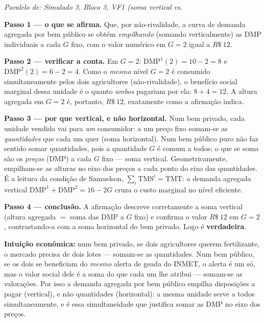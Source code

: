 \begin{solucao}
{\footnotesize\textit{Paralelo de: Simulado 3, Bloco 3, VF1 (soma vertical vs.}}\par\vspace{0.2em}
\textbf{Passo 1 --- o que se afirma.} Que, por n\~ao-rivalidade, a curva de demanda agregada por bem p\'ublico se obt\'em \emph{empilhando} (somando verticalmente) as DMP individuais a cada $G$ fixo, com o valor num\'erico em $G=2$ igual a $R\$~12$.

\textbf{Passo 2 --- verificar a conta.} Em $G=2$: $\text{DMP}^1(2)=10-2=8$ e $\text{DMP}^2(2)=6-2=4$. Como o \emph{mesmo} n\'ivel $G=2$ \'e consumido simultaneamente pelos dois agricultores (n\~ao-rivalidade), o benef\'icio social marginal dessa unidade \'e o quanto \emph{ambos} pagariam por ela: $8+4=12$. A altura agregada em $G=2$ \'e, portanto, $R\$~12$, exatamente como a afirma\c{c}\~ao indica.

\textbf{Passo 3 --- por que vertical, e n\~ao horizontal.} Num bem privado, cada unidade vendida vai para \emph{um} consumidor: a um pre\c{c}o fixo somam-se as \emph{quantidades} que cada um quer (soma horizontal). Num bem p\'ublico puro n\~ao faz sentido somar quantidades, pois a quantidade $G$ \'e comum a todos; o que se soma s\~ao os \emph{pre\c{c}os} (DMP) a cada $G$ fixo --- soma vertical. Geometricamente, empilham-se as alturas no eixo dos pre\c{c}os a cada ponto do eixo das quantidades. \'E a leitura da condi\c{c}\~ao de Samuelson, $\sum_i\text{TMS}^i=\text{TMT}$: a demanda agregada vertical $\text{DMP}^1+\text{DMP}^2=16-2G$ cruza o custo marginal no n\'ivel eficiente.

\textbf{Passo 4 --- conclus\~ao.} A afirma\c{c}\~ao descreve corretamente a soma vertical (altura agregada $=$ soma das DMP a $G$ fixo) e confirma o valor $R\$~12$ em $G=2$, contrastando-a com a soma horizontal do bem privado. Logo \'e \textbf{verdadeira}.

\textbf{Intui\c{c}\~ao econ\^omica:} num bem privado, se dois agricultores querem fertilizante, o mercado precisa de dois lotes --- somam-se as quantidades. Num bem p\'ublico, se os dois se beneficiam do \emph{mesmo} alerta de geada do INMET, o alerta \'e um s\'o, mas o valor social dele \'e a soma do que cada um lhe atribui --- somam-se as valora\c{c}\~oes. Por isso a demanda agregada por bem p\'ublico empilha disposi\c{c}\~oes a pagar (vertical), e n\~ao quantidades (horizontal): a mesma unidade serve a todos simultaneamente, e \'e essa simultaneidade que justifica somar as DMP no eixo dos pre\c{c}os.
\end{solucao}

